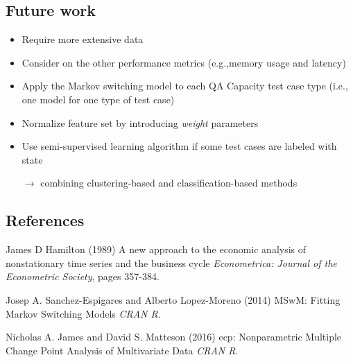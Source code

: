 \documentclass{beamer}
\begin{document}
\subsection{Future work}
\begin{frame}
\begin{itemize}
	\item Require more extensive data
	\item Consider on the other performance metrics (e.g.,memory usage and latency) 
	\item Apply the Markov switching model to each QA Capacity test case type (i.e., one model for one type of test case)
	\item Normalize feature set by introducing \textit{weight} parameters
	\item Use semi-supervised learning algorithm if some test cases are labeled with state
	
	$\rightarrow$ combining clustering-based and classification-based methods 
\end{itemize}
\end{frame}

\subsection{References}
\begin{frame}
\footnotesize{
\begin{thebibliography}{99} %
	 James D Hamilton (1989)
	\newblock A new approach to the economic analysis of nonstationary time series and the business cycle
	\newblock \emph{Econometrica: Journal of the Econometric Society}, pages 357-384.
\end{thebibliography}

\begin{thebibliography}{99} %
	 Josep A. Sanchez-Espigares and Alberto Lopez-Moreno (2014)
	\newblock MSwM: Fitting Markov Switching Models
	\newblock \emph{CRAN R}.
\end{thebibliography}

\begin{thebibliography}{99} %
	 Nicholas A. James and David S. Matteson (2016)
	\newblock ecp: Nonparametric Multiple Change Point Analysis of Multivariate Data
	\newblock \emph{CRAN R}.
\end{thebibliography}
}
\end{frame}
\end{document}
